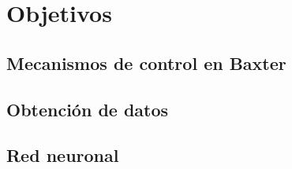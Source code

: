 \chapter{Objetivos}
\section{Mecanismos de control en Baxter}
\section{Obtención de datos}
\section{Red neuronal}